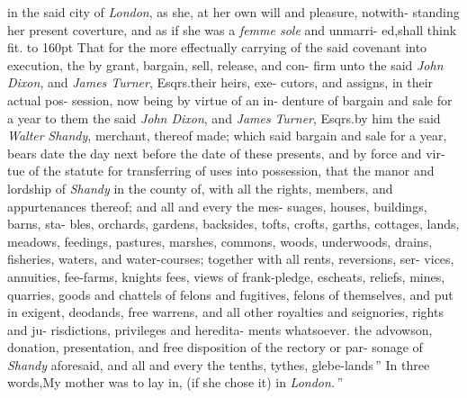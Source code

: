 \documentclass{article}
\begin{document}
\lqq in the said city of \textit{London}, as she, at\break
\lqq her own will and pleasure, notwith-\break
\lqq standing her present coverture, and as\break
\lqq if she was a \textit{femme sole} and unmarri-\break
\lqq ed,\tsk shall think fit.\tsk {}\hbox{}\break
\lqq {}\hbox to 160pt{}\break
\lqq That for the more effectually carrying\break
\lqq of the said covenant into execution, the\break
\lqq {}\break
\lqq by grant, bargain, sell, release, and con-\break
\lqq firm unto the said \textit{John Dixon}, and\break
\lqq \textit{James Turner}, Esqrs.\@ their heirs, exe-
\lqq cutors, and assigns, in their actual pos-\break
\lqq session, now being by virtue of an in-\break
\lqq denture of bargain and sale for a year\break
\lqq to them the said \textit{John Dixon}, and \textit{James}\break
\lqq \textit{Turner}, Esqrs.\@ by him the said \textit{Walter}\break
\lqq \textit{Shandy}, merchant, thereof made; which\break
\lqq said bargain and sale for a year, bears\break
\lqq date the day next before the date of\break
\lqq these presents, and by force and vir-\break
\lqq tue of the statute for transferring of\break
\lqq uses into possession,\tsk {}\hbox{} that\break
\lqq the manor and lordship of \textit{Shandy} in\break
\lqq the county of\tsh , with all the\break
\lqq rights, members, and appurtenances\break
\lqq thereof; and all and every the mes-\break
\lqq suages, houses, buildings, barns, sta-\break
\lqq bles, orchards, gardens, backsides,\break
\lqq tofts, crofts, garths, cottages, lands,\break
\lqq meadows, feedings, pastures, marshes,\break
\lqq commons, woods, underwoods, drains,\break
\lqq fisheries, waters, and water-courses;\tsk{} 
\lqq together with all rents, reversions, ser-\break
\lqq vices, annuities, fee-farms, knights\break
\lqq fees, views of frank-pledge, escheats,\break
\lqq reliefs, mines, quarries, goods and\break
\lqq chattels of felons and fugitives, felons\break
\lqq of themselves, and put in exigent,\break
\lqq deodands, free warrens, and all other\break
\lqq royalties and seignories, rights and ju-\break
\lqq risdictions, privileges and heredita-\break
\lqq ments whatsoever.\tsk {}\hbox{} the\break
\lqq advowson, donation, presentation, and\break
\lqq free disposition of the rectory or par-\break
\lqq sonage of \textit{Shandy} aforesaid, and all and\break
\lqq every the tenths, tythes, glebe-lands\,”\break
\tsh In three words,\tsh \lqq My mother\break
\lqq was to lay in, (if she chose it) in\break
\lqq \textit{London.}\,”
\end{document}
